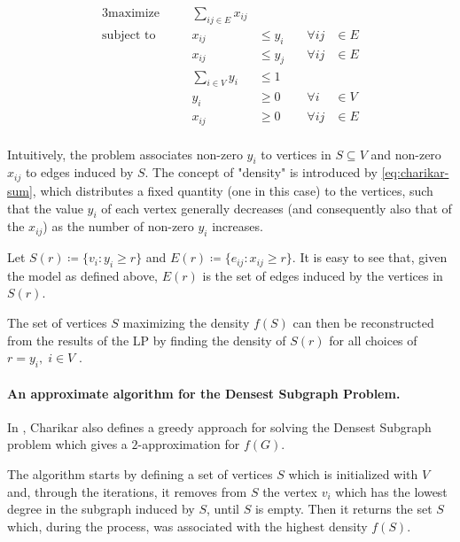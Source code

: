 \begin{alignat}{3}
	\label{eq:charikar-model-densest-subgraph}
	\text{maximize}   &       & \sum_{ij \in E} x_{ij}                                          \\
	\text{subject to} & \quad & x_{ij}                  & \leq y_{i} & \quad \forall ij & \in E \\
	                  &       & x_{ij}                  & \leq y_{j} & \quad \forall ij & \in E \\
	\label{eq:charikar-sum}
	                  &       & \sum^{}_{i \in V} y_{i} & \leq 1     &                          \\
	                  &       & y_{i}                   & \geq 0     & \quad \forall i  & \in V \\
	                  &       & x_{ij}                  & \geq 0     & \quad \forall ij & \in E \\
\end{alignat}

Intuitively, the problem associates non-zero $y_i$ to vertices in $S \subseteq V$
and non-zero $x_{ij}$ to edges induced by $S$. The concept of "density" is
introduced by \eqref{eq:charikar-sum}, which distributes a fixed quantity
(one in this case) to the vertices, such that the value $y_i$ of each vertex
generally decreases (and consequently also that of the $x_{ij}$) as the number of non-zero $y_i$ increases.

Let $S(r) \coloneqq \{v_{i} : y_{i} \geq r\} $ and $E(r) \coloneqq \{e_{ij} :
	x_{ij} \geq r\} $. It is easy to see that, given the model as defined
above, $E(r)$ is the set of edges induced by the vertices in $S(r)$.

The set of vertices $S$ maximizing the density $f(S)$ can then be reconstructed
from the results of the \acrshort{LP} by finding the density of $S(r)$
for all choices of $r = y_{i}, \; i \in V $ \cite{charikar2000greedy}.

\paragraph{An approximate algorithm for the Densest Subgraph Problem.}%
\label{par:an_approximate_algorithm_for_the_densest_subgraph_problem}

In \cite{charikar2000greedy}, Charikar also defines a greedy approach for
solving the Densest Subgraph problem which gives a $2$-approximation for
$f(G)$.

The algorithm starts by defining a set of vertices $S$ which is initialized
with $V$ and, through the iterations, it removes from $S$ the vertex $v_i$
which has the lowest degree in the subgraph induced by $S$, until $S$ is empty.
Then it returns the set $S$ which, during the process, was associated with the
highest density $f(S)$.


